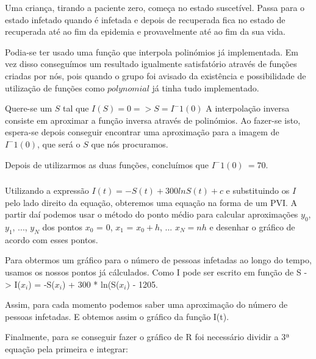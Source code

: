 \documentclass[portuguese, a4paper]{article}
\begin{document}
		Uma criança, tirando a paciente zero, começa no estado suscetível. Passa
		para o estado infetado quando é infetada e depois de recuperada fica no estado de recuperada até ao fim da
		epidemia e provavelmente até ao fim da sua vida.


		Podia-se ter usado uma função que interpola polinómios já implementada.
		Em vez disso conseguímos um resultado igualmente satisfatório através de funções criadas por nós, pois
		quando o grupo foi avisado da existência e possibilidade de utilização de funções como $polynomial$ %
		já tinha tudo implementado.

		Quere-se um $S$ tal que $I(S) = 0 => S = I^-1(0)$
		A interpolação inversa consiste em aproximar a função inversa através de polinómios.
		Ao fazer-se isto, espera-se depois conseguir encontrar uma aproximação para a imagem de $I^-1(0)$,
		que será o $S$ que nós procuramos.
		\par
		Depois de utilizarmos as duas funções, concluímos que $I^-1(0) ~= 70$.

		\subsubsection{}
		\par
		
		Utilizando a expressão $I(t) = -S(t) + 300 ln S(t) + c$ e substituindo
		os $I$ pelo lado direito da equação, obteremos uma equação na forma de um 
		PVI. A partir daí podemos usar o método do ponto médio para calcular aproximações $y_0$, $y_1$, ..., $y_N$ dos pontos
		$x_0$ = 0, $x_1$ = $x_0 + h$, ... $x_N= nh$ e desenhar o gráfico de acordo com esses pontos.
		
		Para obtermos um gráfico para o número de pessoas infetadas ao longo do tempo, usamos os nossos
		pontos já cálculados.
		Como I pode ser escrito em função de S ->
		I($x_i$) = -S($x_i$) + 300 * ln(S($x_i$) - 1205.
		
		Assim, para cada momento podemos saber uma aproximação do número de pessoas infetadas. E obtemos assim
		o gráfico da função I(t).
		
		Finalmente, para se conseguir fazer o gráfico de R foi necessário dividir a 3ª equação pela primeira e integrar:
		
\end{document}

